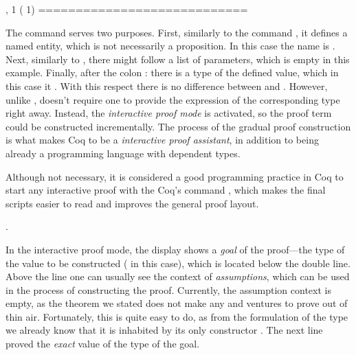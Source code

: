 \coqdoceol
\coqdocemptyline
{} ,  1 ( 1)\coqdoceol
\coqdocindent{1.00em}
\coqdoceol
\coqdocindent{1.00em}
============================\coqdoceol
\coqdocindent{1.50em}

\coqdocemptyline


The command   serves two purposes. First, similarly to the
command , it defines a named entity, which is not
necessarily a proposition. In this case the name is
. Next, similarly to , there might follow a
list of parameters, which is empty in this example. Finally, after the
colon : there is a type of the defined value, which in this case it
. With this respect there is no difference between  and
. However, unlike ,  doesn't require
one to provide the expression of the corresponding type right
away. Instead, the \textit{interactive proof mode}   
is activated, so the proof term could be constructed
incrementally. The process of the gradual proof construction is what
makes Coq to be a \textit{interactive proof assistant}, in addition to being
already a programming language with dependent types.


Although not necessary, it is considered a good programming practice
in Coq to start any interactive proof with the Coq's command
 , which makes the final scripts easier to read
and improves the general proof layout.


\begin{coqdoccode}
\coqdocemptyline
\coqdocnoindent
{}.\coqdoceol
\coqdocemptyline
\end{coqdoccode}


 In the interactive proof mode, the  display
shows a \textit{goal} of the proof---the type of the value to be constructed
( in this case), which is located below the double line. Above
the line one can usually see the context of \textit{assumptions}, which can
be used in the  process of constructing the
proof. Currently, the assumption context is empty, as the theorem we
stated does not make any and ventures to prove  out of thin
air. Fortunately, this is quite easy to do, as from the formulation of
the  type we already know that it is inhabited by its only
constructor . The next line proved the \textit{exact} value of the type of
the goal.


